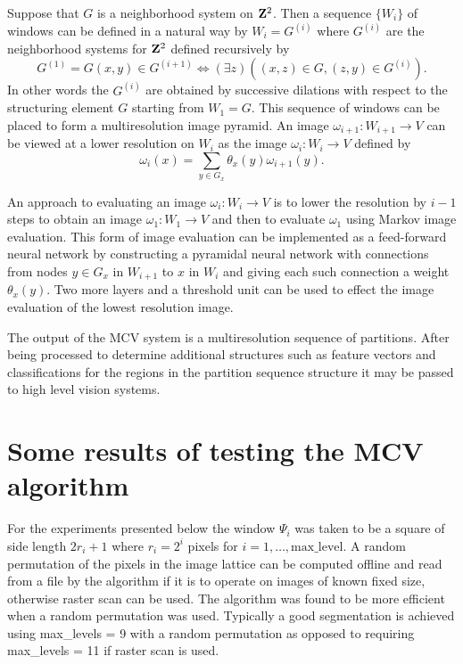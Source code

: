 \documentclass[12pt,twoside]{article}
\begin{document}
Suppose that $G$ is a neighborhood system on ${\bf Z}^2$. Then a sequence $\{W_i\}$ of windows can be
defined in a natural way by $W_i = G^{(i)}$ where $G^{(i)}$ are the neighborhood systems for ${\bf Z}^2$ defined
recursively by
\begin{equation}
G^{(1)} = G(x,y) \in G^{(i+1)} \Leftrightarrow (\exists z) ((x, z) \in G, (z, y) \in G^{(i)}).
\end{equation}
In other words the $G^{(i)}$ are obtained by successive dilations with respect to the structuring
element $G$ starting from $W_1 = G$. This sequence of windows can be placed to form a multiresolution image
pyramid. An image $\omega_{i+1} : W_{i+1} \rightarrow V$ can be viewed at a lower resolution on $W_i$ as the
image $\omega_i : W_i \rightarrow V$ defined by
\begin{equation}
\omega_i(x) = \sum_{y\in G_x}\theta_x(y)\omega_{i+1}(y).
\end{equation}

An approach to evaluating an image $\omega_i : W_i \rightarrow V$ is to lower the resolution by $i-1$ steps to obtain
an image $\omega_1 : W_1 \rightarrow V$ and then to evaluate $\omega_1$ using Markov image evaluation. This form
of image evaluation can be implemented as a feed-forward neural network by constructing a
pyramidal neural network with connections from nodes $y \in G_x$ in $W_{i+1}$ to $x$ in $W_i$ and giving
each such connection a weight $\theta_x(y)$. Two more layers and a threshold unit can be used to effect
the image evaluation of the lowest resolution image.

The output of the MCV system is a multiresolution sequence of partitions. After being processed
to determine additional structures such as feature vectors and classifications for the regions
in the partition sequence structure it may be passed to high level vision systems.

\section{Some results of testing the MCV algorithm}

For the experiments presented below the window $\Psi_i$ was taken to be a square of side length
$2r_i + 1$ where $r_i = 2^i$ pixels for $i = 1, \ldots, \mbox{max\_level}$. A random permutation of the pixels in the
image lattice can be computed offline and read from a file by the algorithm if it is to operate
on images of known fixed size, otherwise raster scan can be used. The algorithm was found to
be more efficient when a random permutation was used. Typically a good segmentation is
achieved using max\_levels = 9 with a random permutation as opposed to requiring
max\_levels = 11  if raster scan is used.
\end{document}
